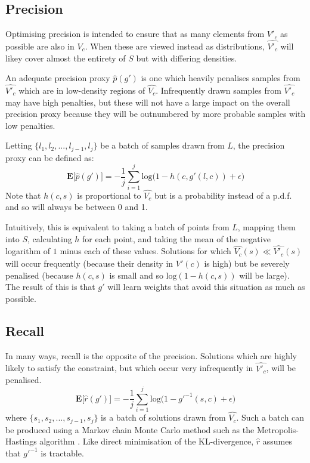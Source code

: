 \documentclass[../../main.tex]{subfiles}
\begin{document}
\subsection{Precision} \label{subsection:precision}

Optimising precision is intended to ensure that as many elements from $V'_c$ as possible are also in $V_c$.
When these are viewed instead as distributions, $\hat{V'_c}$ will likey cover almost the entirety of $S$ but with differing densities.

An adequate precision proxy $\hat{p}(g')$ is one which heavily penalises samples from $\hat{V'_c}$ which are in low-density regions of $\hat{V_c}$.
Infrequently drawn samples from $\hat{V'_c}$ may have high penalties, but these will not have a large impact on the overall precision proxy because they will be outnumbered by more probable samples with low penalties.

Letting $\{l_1,l_2,...,l_{j-1},l_j\}$ be a batch of samples drawn from $L$, the precision proxy can be defined as:
\begin{equation}
    \textbf{E}\big[\hat{p}(g')\big]=-\frac{1}{j}\sum_{i=1}^{j}\text{log}\big(1-h(c,g'(l,c))+\epsilon\big)
\end{equation}
Note that $h(c,s)$ is proportional to $\hat{V_c}$ but is a probability instead of a p.d.f. and so will always be between 0 and 1.

Intuitively, this is equivalent to taking a batch of points from $L$, mapping them into $S$, calculating $h$ for each point, and taking the mean of the negative logarithm of $1$ minus each of these values.
Solutions for which $\hat{V_c}(s)\ll\hat{V'_c}(s)$ will occur frequently (because their density in $\hat{V'}(c)$ is high) but be severely penalised (because $h(c,s)$ is small and so $\text{log}(1-h(c,s))$ will be large).
The result of this is that $g'$ will learn weights that avoid this situation as much as possible.

\subsection{Recall} \label{subsection:recall}

In many ways, recall is the opposite of the precision.
Solutions which are highly likely to satisfy the constraint, but which occur very infrequently in $\hat{V'_c}$, will be penalised.
\begin{equation}
    \textbf{E}\big[\hat{r}(g')\big]=-\frac{1}{j}\sum_{i=1}^{j}\text{log}\big(1-g'^{-1}(s,c)+\epsilon\big)
\end{equation}
where $\{s_1,s_2,...,s_{j-1},s_j\}$ is a batch of solutions drawn from $\hat{V_c}$.
Such a batch can be produced using a Markov chain Monte Carlo method such as the Metropolis-Hastings algorithm \cite{robert16}.
Like direct minimisation of the KL-divergence, $\hat{r}$ assumes that $g'^{-1}$ is tractable.
\end{document}
